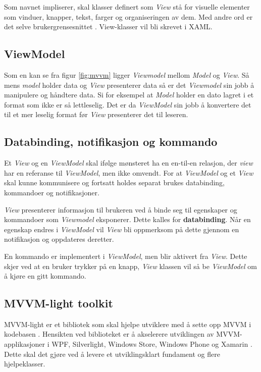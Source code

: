  Som navnet impliserer, skal klasser definert som \textit{View} stå for visuelle elementer som vinduer, knapper, tekst, farger og organiseringen av dem. Med andre ord er det selve brukergrensesnittet \cite{THEM6:online}. View-klasser vil bli skrevet i XAML.

 
\subsection{ViewModel}
 
 Som en kan se fra figur \ref{fig:mvvm} ligger \textit{Viewmodel} mellom \textit{Model} og \textit{View}. Så mens \textit{model} holder data og \textit{View} presenterer data så er det \textit{Viewmodel} sin jobb å manipulere og håndtere data. Si for eksempel at \textit{Model} holder en dato lagret i et format som ikke er så lettleselig. Det er da \textit{ViewModel} sin jobb å konvertere det til et mer leselig format før \textit{View} presenterer det til leseren. 
 
\subsection{Databinding, notifikasjon og kommando}

Et \textit{View} og en \textit{ViewModel} skal ifølge mønsteret ha en en-til-en relasjon, der \textit{view} har en referanse til \textit{ViewModel}, men ikke omvendt. For at \textit{ViewModel} og et \textit{View} skal kunne kommunisere og fortsatt holdes separat brukes databinding, kommandoer og notifikasjoner. 

\textit{View} presenterer informasjon til brukeren ved å binde seg til egenskaper og kommandoer som \textit{Viewmodel} eksponerer. Dette kalles for \textbf{databinding}. Når en egenskap endres i \textit{ViewModel} vil \textit{View} bli oppmerksom på dette gjennom en notifikasjon og oppdateres deretter. 

En kommando er implementert i \textit{ViewModel}, men blir aktivert fra \textit{View}. Dette skjer ved at en bruker trykker på en knapp, \textit{View} klassen vil så be \textit{ViewModel} om å kjøre en gitt kommando.

\subsection{MVVM-light toolkit} 
 
 MVVM-light er et bibliotek som skal hjelpe utviklere med å sette opp MVVM i kodebasen \cite{Nico0:online}. Hensikten ved biblioteket er å akselerere utviklingen av MVVM-applikasjoner i WPF, Silverlight, Windows Store, Windows Phone og Xamarin \cite{MVVM8:online}. Dette skal det gjøre ved å levere et utviklingsklart fundament og flere hjelpeklasser. 


